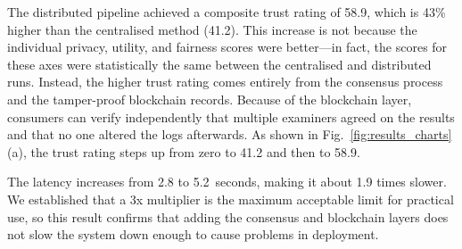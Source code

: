 The distributed pipeline achieved a composite trust rating of 58.9, which is 43\% higher than the centralised method (41.2). This increase is not because the individual privacy, utility, and fairness scores were better---in fact, the scores for these axes were statistically the same between the centralised and distributed runs. Instead, the higher trust rating comes entirely from the consensus process and the tamper-proof blockchain records. Because of the blockchain layer, consumers can verify independently that multiple examiners agreed on the results and that no one altered the logs afterwards. As shown in Fig.~\ref{fig:results_charts}(a), the trust rating steps up from zero to 41.2 and then to 58.9.

The latency increases from 2.8 to 5.2~seconds, making it about 1.9 times slower. We established that a 3x multiplier is the maximum acceptable limit for practical use, so this result confirms that adding the consensus and blockchain layers does not slow the system down enough to cause problems in deployment.

